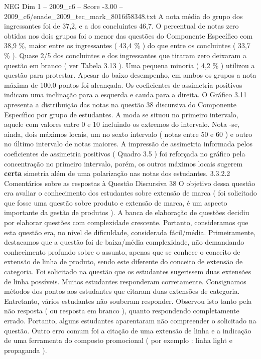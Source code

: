 \begin{textsample}{NEG Dim 1 – 2009\_c6 – Score -3.00 – 2009\_c6/enade\_2009\_tec\_mark\_8016f58348.txt}
A nota média do grupo dos ingressantes foi de 37,2, e a dos concluintes 46,7.
O percentual de notas zero obtidas nos dois grupos foi o menor das questões do Componente Específico com 38,9 \%, maior entre os ingressantes ( 43,4 \% ) do que entre os concluintes ( 33,7 \% ).
Quase 2/5 dos concluintes e dos ingressantes que tiraram zero deixaram a questão em branco ( ver Tabela 3.13 ).
Uma pequena minoria ( 4,2 \% ) utilizou a questão para protestar.
Apesar do baixo desempenho, em ambos os grupos a nota máxima de 100,0 pontos foi alcançada.
Os coeficientes de assimetria positivos indicam uma inclinação para a esquerda e cauda para a direita.
O Gráfico 3.11 apresenta a distribuição das notas na questão 38 discursiva do Componente Específico por grupo de estudantes.
A moda se situou no primeiro intervalo, aquele com valores entre 0 e 10 incluindo os extremos do intervalo.
Nota -se, ainda, dois máximos locais, um no sexto intervalo ( notas entre 50 e 60 ) e outro no último intervalo de notas maiores.
A impressão de assimetria informada pelos coeficientes de assimetria positivos ( Quadro 3.5 ) foi reforçada no gráfico pela concentração no primeiro intervalo, porém, os outros máximos locais sugerem \textbf{certa} simetria além de uma polarização nas notas dos estudantes. 3.3.2.2 Comentários sobre as respostas à Questão Discursiva 38 O objetivo dessa questão era avaliar o conhecimento dos estudantes sobre extensão de marca ( foi solicitado que fosse uma questão sobre produto e extensão de marca, é um aspecto importante da gestão de produtos ).
A banca de elaboração de questões decidiu por elaborar questões com complexidade crescente.
Portanto, consideramos que esta questão era, no nível de dificuldade, considerada fácil/média.
Primeiramente, destacamos que a questão foi de baixa/média complexidade, não demandando conhecimento profundo sobre o assunto, apenas que se conhece o conceito de extensão de linha de produto, sendo este diferente do conceito de extensão de categoria.
Foi solicitado na questão que os estudantes sugerissem duas extensões de linha possíveis.
Muitos estudantes responderam corretamente.
Consignamos métodos dos pontos aos estudantes que citaram duas extensões de categoria.
Entretanto, vários estudantes não souberam responder.
Observou isto tanto pela não resposta ( ou resposta em branco ), quanto respondendo completamente errado.
Portanto, alguns estudantes aparentaram não compreender o solicitado na questão.
Outro erro comum foi a citação de uma extensão de linha e a indicação de uma ferramenta do composto promocional ( por exemplo : linha light e propaganda ).

\end{textsample}
